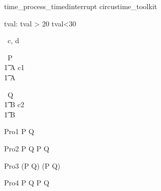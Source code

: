 \begin{zsection}
   \SECTION time\_process\_timedinterrupt \parents circustime\_toolkit
\end{zsection}


\begin{axdef}
   tval: \nat
\where
   tval > 20 \land tval<30
\end{axdef}



\begin{circus}
   \circchannel\ c, d \\
\end{circus}



\begin{circus}
    \circprocess\ P \circdef  \circbegin  \\
    \t1 A \circdef c1 \then \Skip \\
    \t1 \circspot A \\
    \circend
\end{circus}



\begin{circus}
    \circprocess\ Q \circdef  \circbegin  \\
    \t1 B \circdef c2 \then \Skip \\
    \t1 \circspot B \\
    \circend
\end{circus}


\begin{circus}
    \circprocess Pro1 \circdef P \circtimedinterrupt  {} \rcirctime Q\\
\end{circus}

\begin{circus}
    \circprocess Pro2 \circdef P \circtimedinterrupt {} \rcirctime Q \circseq P \circtimedinterrupt {} \rcirctime Q \\
\end{circus}
    
\begin{circus}
    \circprocess Pro3 \circdef (P \circtimedinterrupt {} \rcirctime Q) \circseq (P \circtimedinterrupt {} \rcirctime Q) \\
\end{circus}
    
\begin{circus}
    \circprocess Pro4 \circdef P \circtimedinterrupt {} \rcirctime Q \extchoice P \circtimedinterrupt {} \rcirctime Q \\ 
\end{circus}
    
